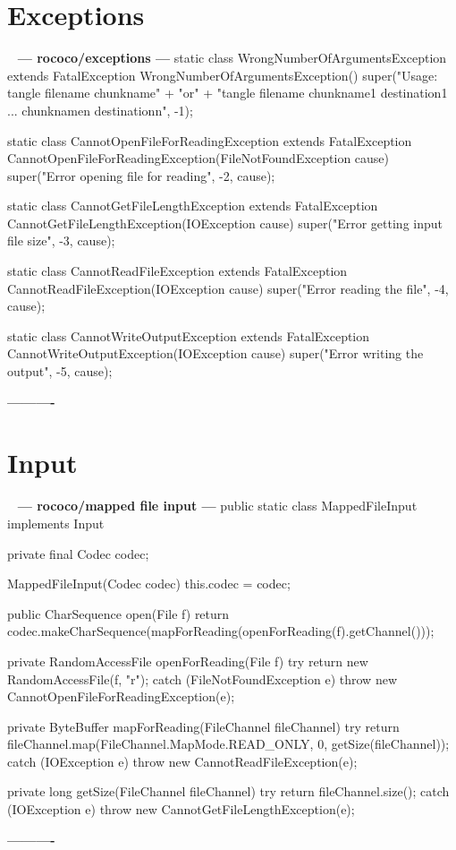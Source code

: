 \documentclass{book}
\newenvironment{chunk}[1]{%
{\ }\newline\noindent%
\hbox{\hskip 2.0cm}{\bf --- #1 ---}%
\verbatim}%                               say exactly what we see
{\endverbatim%
\par{}%
\noindent{}%
\hbox{\hskip 2.0cm}{\bf ----------}%
\par%
\normalsize\noindent}%
\begin{document}
\section{Exceptions}
\begin{chunk}{rococo/exceptions}
static class WrongNumberOfArgumentsException extends FatalException {
    WrongNumberOfArgumentsException() {
        super("Usage: tangle filename chunkname\n" +
                "or\n" +
                "tangle filename chunkname1 destination1 ... chunknamen destinationn",
              -1);
    }
}

static class CannotOpenFileForReadingException extends FatalException {
    CannotOpenFileForReadingException(FileNotFoundException cause) {
        super("Error opening file for reading", -2, cause);
    }
}

static class CannotGetFileLengthException extends FatalException {
    CannotGetFileLengthException(IOException cause) {
        super("Error getting input file size", -3, cause);
    }
}

static class CannotReadFileException extends FatalException {
    CannotReadFileException(IOException cause) {
        super("Error reading the file", -4, cause);
    }
}

static class CannotWriteOutputException extends FatalException {
    CannotWriteOutputException(IOException cause) {
        super("Error writing the output", -5, cause);
    }
}
\end{chunk}

\section{Input}
\begin{chunk}{rococo/mapped file input}
public static class MappedFileInput implements Input {
    private final Codec codec;

    MappedFileInput(Codec codec) {
        this.codec = codec;
    }

    public CharSequence open(File f) {
        return codec.makeCharSequence(mapForReading(openForReading(f).getChannel()));
    }

    private RandomAccessFile openForReading(File f) {
        try {
            return new RandomAccessFile(f, "r");
        } catch (FileNotFoundException e) {
            throw new CannotOpenFileForReadingException(e);
        }
    }

    private ByteBuffer mapForReading(FileChannel fileChannel) {
        try {
            return fileChannel.map(FileChannel.MapMode.READ_ONLY, 0, getSize(fileChannel));
        } catch (IOException e) {
            throw new CannotReadFileException(e);
        }
    }

    private long getSize(FileChannel fileChannel) {
        try {
            return fileChannel.size();
        } catch (IOException e) {
            throw new CannotGetFileLengthException(e);
        }
    }
}
\end{chunk}
\end{document}
